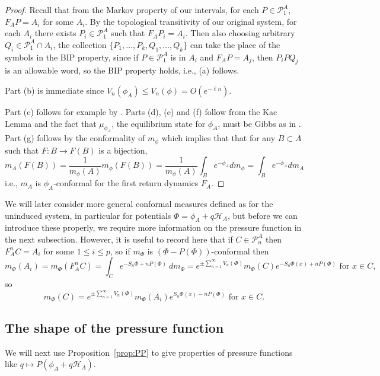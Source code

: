 \documentclass[11pt, reqno]{amsart}
\numberwithin{equation}{section}
\theoremstyle{plain}%
\theoremstyle{definition}
\def\P{\ensuremath{\mathcal P}}
\renewcommand{\H}{\mathcal{H}}
\theoremstyle{nonumberplain}
\begin{document}
\begin{proof}
Recall that from the Markov property of our intervals, for each $P\in\P_1^A$, $F_AP= A_i$ for some $A_i$. 
By the topological transitivity of our original system, for each $A_i$ there exists $P_i\in \P_1^A$ such that $F_AP_i = A_i$.  Then also choosing arbitrary $Q_i\in \P_1^A\cap A_i$, the collection $\{P_1, \ldots, P_k, Q_1, \ldots, Q_k\}$ can take the place of the symbols in the BIP property, since if $P\in \P_1^A$ is in $A_i$ and $F_AP=A_j$, then $P_iPQ_j$ is an allowable word, so the BIP property holds, i.e., (a) follows. 


Part (b) is immediate since $V_n(\phi_A)\le V_n(\phi)= O(e^{-\ell n})$.

Part (c) follows for example by \cite[Lemma 4.1]{IomTod10}.  Parts (d), (e) and (f) follow from the Kac Lemma and the fact that $\mu_{\phi_A}$, the equilibrium state for $\phi_A$, must be Gibbs as in \cite{Sar03}.    Part (g) follows by the conformality of $m_\phi$ which implies that that for any $B \subset A$ such that $F:B \to F(B)$ is a bijection, 
$$m_A(F(B))=\frac1{m_\phi(A)}m_\phi(F(B))= \frac1{m_\phi(A)} \int_B e^{-\phi_A}dm_\phi=  \int_B e^{-\phi_A}dm_A$$
i.e., $m_A$ is $\phi_A$-conformal for the first return dynamics $F_A$. 
\end{proof}

We will later consider more general conformal measures defined as for the uninduced system, in particular for potentials $\Phi=\phi_A+q\H_A$, but before we can introduce these properly, we require more information on the pressure function in the next subsection.  However, it is useful to record here that 
if $C\in \P_n^A$ then $F_A^{n}C = A_i$ for some $1\le i\le p$, so if $m_\Phi$ is $(\Phi-P(\Phi))$-conformal then
$$m_\Phi(A_i)=m_\Phi(F_A^nC)  = \int_Ce^{-S_n\Phi+nP(\Phi)}~dm_\Phi = e^{\pm \sum_{n=1}^\infty V_n(\Phi)}m_\Phi(C)e^{-S_n\Phi(x)+nP(\Phi)} \text{ for } x\in C,$$
 so 
 \begin{equation} m_\Phi(C)= e^{\pm \sum_{n=1}^\infty V_n(\Phi)}m_\Phi(A_i)e^{S_n\Phi(x)-nP(\Phi)} \text{ for } x\in C.
 \label{eq:conf}
 \end{equation}








\subsection{The shape of the pressure function}
We will next use Proposition~\ref{prop:PP} to give properties of pressure functions like $q\mapsto P(\phi_A+q\H_A)$.
\end{document}
